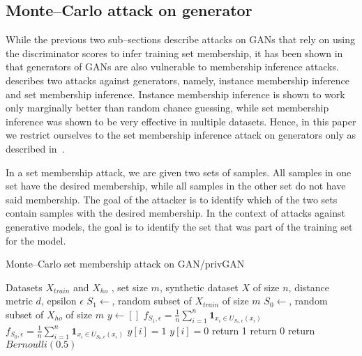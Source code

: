 \documentclass{article}
\begin{document}
\subsection{Monte--Carlo attack on generator}
While the previous two sub--sections describe attacks on GANs that rely on using the discriminator scores to infer training set membership, it has been shown in~\cite{hilprecht2019monte} that generators of GANs are also vulnerable to membership inference attacks. ~\cite{hilprecht2019monte} describes two attacks against generators, namely, instance membership inference and set membership inference. Instance membership inference is shown to work only marginally better than random chance guessing, while set membership inference was shown to be very effective in multiple datasets. Hence, in this paper we restrict ourselves to the set membership inference attack on generators only as described in~\cite{hilprecht2019monte}. 

In a set membership attack, we are given two sets of samples. All samples in one set have the desired membership, while all samples in the other set do not have said membership. The goal of the attacker is to identify which of the two sets contain samples with the desired membership. In the context of attacks against generative models, the goal is to identify the set that was part of the training set for the model. 

\begin{algorithm}
   \caption{Monte--Carlo set membership attack on GAN/privGAN}
   \label{alg:mc}
\begin{algorithmic}
    Datasets $X_{train}$ and $X_{ho}$ , set size $m$, synthetic dataset $X$ of size $n$, distance metric $d$, epsilon $\epsilon$ 
   \STATE $S_1 \leftarrow$, random subset of $X_{train}$ of size $m$
   \STATE $S_0 \leftarrow$, random subset of $X_{ho}$ of size $m$
   \STATE $y \leftarrow []$
   \STATE $f_{S_1,\epsilon} = \frac{1}{n}\sum_{i=1}^n\mathbf{1}_{x_i \in U_{S_1,\epsilon}(x_i)}$
   \STATE $f_{S_0,\epsilon} = \frac{1}{n}\sum_{i=1}^n\mathbf{1}_{x_i \in U_{S_0,\epsilon}(x_i)}$  
   \STATE $y[i] = 1$
   \ELSE 
   \STATE $y[i] = 0$
   \ENDIF
   \ENDFOR
   \STATE return 1 
   \STATE return 0 
   \ELSE
   \STATE return $Bernoulli(0.5)$
   \ENDIF
\end{algorithmic}
\end{algorithm}
\end{document}
